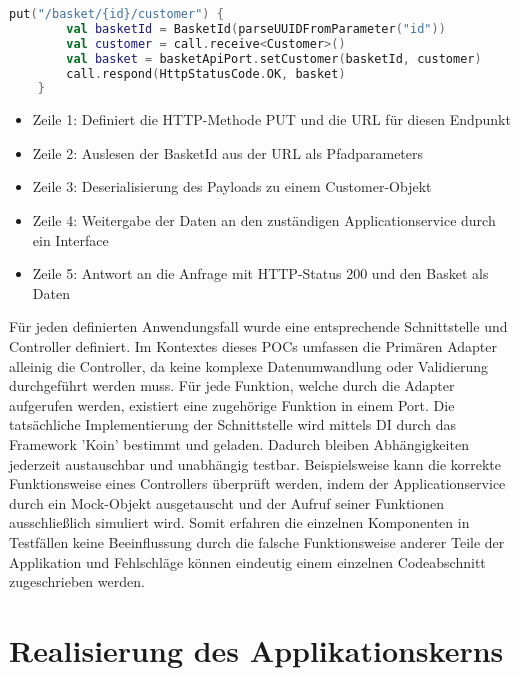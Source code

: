 \begin{minipage}{\linewidth} %
\begin{lstlisting}[caption={Beispiel eines Controllers zum aktualiseren von Kundendaten}, label={lst:controller}, language=Kotlin]
	put("/basket/{id}/customer") { 
		val basketId = BasketId(parseUUIDFromParameter("id")) 
		val customer = call.receive<Customer>()  
		val basket = basketApiPort.setCustomer(basketId, customer)
		call.respond(HttpStatusCode.OK, basket)
	}
\end{lstlisting}
\end{minipage}

\begin{itemize}[noitemsep,nolistsep]
	\item Zeile 1: Definiert die HTTP-Methode PUT und die URL für diesen Endpunkt
	\item Zeile 2: Auslesen der BasketId aus der URL als Pfadparameters 
	\item Zeile 3: Deserialisierung des Payloads zu einem Customer-Objekt
	\item Zeile 4: Weitergabe der Daten an den zuständigen Applicationservice durch ein Interface
	\item Zeile 5: Antwort an die Anfrage mit HTTP-Status 200 und den Basket als Daten
\end{itemize}

Für jeden definierten Anwendungsfall wurde eine entsprechende Schnittstelle und Controller definiert. Im Kontextes dieses POCs umfassen die Primären Adapter alleinig die Controller, da keine komplexe Datenumwandlung oder Validierung durchgeführt werden muss. Für jede Funktion, welche durch die Adapter aufgerufen werden, existiert eine zugehörige Funktion in einem Port. Die tatsächliche Implementierung der Schnittstelle wird mittels \acrlong{DI} durch das Framework 'Koin' bestimmt und geladen. Dadurch bleiben Abhängigkeiten jederzeit austauschbar und unabhängig testbar. Beispielsweise kann die korrekte Funktionsweise eines Controllers überprüft werden, indem der Applicationservice durch ein Mock-Objekt ausgetauscht und der Aufruf seiner Funktionen ausschließlich simuliert wird. Somit erfahren die einzelnen Komponenten in Testfällen keine Beeinflussung durch die falsche Funktionsweise anderer Teile der Applikation und Fehlschläge können eindeutig einem einzelnen Codeabschnitt zugeschrieben werden.



\section{Realisierung des Applikationskerns}

